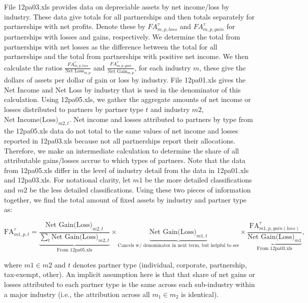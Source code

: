 \documentclass[article,11pt,letterpaper,fleqn]{article}
\theoremstyle{definition}
\numberwithin{equation}{section}
\begin{document}
File 12pa03.xls provides data on depreciable assets by net income/loss by industry.  These data give totals for all partnerships and then totals separately for partnerships with net profits.  Denote these by $FA^{\tau}_{m,p,loss}$ and $FA^{\tau}_{m,p,gain}$ for partnerships with losses and gains, respectively.  We determine the total from partnerships with net losses as the difference between the total for all partnerships and the total from partnerships with positive net income.  We then calculate the ratios $\frac{FA^{\tau}_{m,p,loss}}{\text{Net Loss}_{m,p}}$ and $\frac{FA^{\tau}_{m,p,gain}}{\text{Net Gain}_{m,p}}$, for each industry $m$, these give the dollars of assets per dollar of gain or loss by industry.  File 12pa01.xls gives the Net Income and Net Loss by industry that is used in the denominator of this calculation.  Using 12pa05.xls, we gather the aggregate amounts of net income or losses distributed to partners by partner type $t$ and industry $m2$, $\text{Net Income(Loss)}_{m2,t}$.  Net income and losses attributed to partners by type from the 12pa05.xls data do not total to the same values of net income and losses reported in 12pa03.xls because not all partnerships report their allocations.  Therefore, we make an intermediate calculation to determine the share of all attributable gains/losses accrue to which types of partners.  Note that the data from 12pa05.xls differ in the level of industry detail from the data in 12pa01.xls and 12pa03.xls.  For notational clarity, let $m1$ be the more detailed classifications and $m2$ be the less detailed classifications.  Using these two pieces of information together, we find the total amount of fixed assets by industry and partner type as:  

\begin{equation}
\text{FA}^{\tau}_{m1,p,t}=  \underbrace{\frac{\text{Net Gain(Loss)}_{m2,t}}{\sum_{t}\text{Net Gain(Loss)}_{m2,t}}}_{\text{From 12pa05.xls}} \times \underbrace{\text{Net Gain(Loss)}_{m1,t}}_{\text{Cancels w/ denominator in next term, but helpful to see}} \times \underbrace{\frac{\text{FA}^{\tau}_{m1,p,gain(loss)}}{\text{Net Gain(Loss)}_{m1}}}_{\text{From 12pa03.xls}},
\end{equation}

\noindent\noindent where $m1\in m2$ and $t$ denotes partner type (individual, corporate, partnership, tax-exempt, other).  An implicit assumption here is that that share of net gains or losses attributed to each partner type is the same across each sub-industry within a major industry (i.e., the attribution across all $m_{1}\in m_{2}$ is identical).
\end{document}
